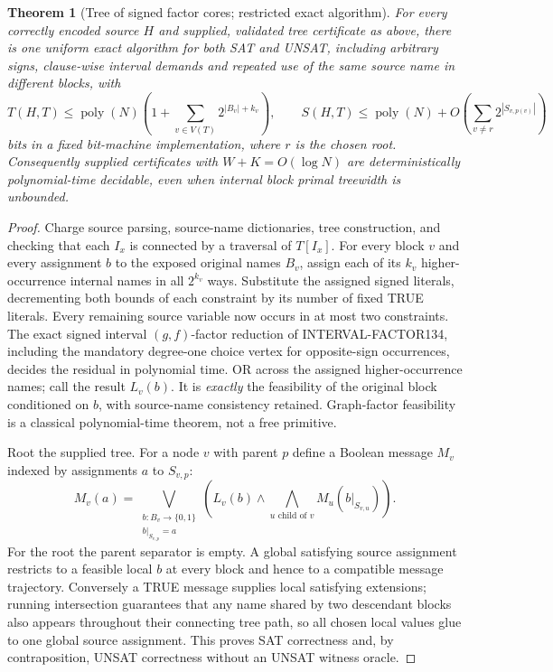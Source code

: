 \documentclass[11pt]{article}
\newtheorem{theorem}{Theorem}
\begin{document}
\begin{theorem}[Tree of signed factor cores; restricted exact algorithm]
For every correctly encoded source $H$ and \emph{supplied, validated}
tree certificate as above, there is one uniform exact algorithm for
both SAT and UNSAT, including arbitrary signs, clause-wise interval
demands and repeated use of the same source name in different blocks,
with
\[
T(H,T)\le \operatorname{poly}(N)
\left(1+\sum_{v\in V(T)}2^{|B_v|+k_v}\right),\qquad
S(H,T)\le \operatorname{poly}(N)+
O\!\left(\sum_{v\ne r}2^{|S_{v,p(v)}|}\right)
\]
bits in a fixed bit-machine implementation, where $r$ is the chosen root.
Consequently supplied certificates with $W+K=O(\log N)$ are
deterministically polynomial-time decidable, even when internal
block primal treewidth is unbounded.
\end{theorem}
\begin{proof}
Charge source parsing, source-name dictionaries, tree construction,
and checking that each $I_x$ is connected by a traversal of $T[I_x]$.
For every block $v$ and every assignment $b$ to the exposed original
names $B_v$, assign each of its $k_v$ higher-occurrence internal names
in all $2^{k_v}$ ways. Substitute the assigned signed literals, decrementing
both bounds of each constraint by its number of fixed TRUE literals.
Every remaining source variable now occurs in at most two constraints.
The exact signed interval $(g,f)$-factor reduction of
INTERVAL-FACTOR134, including the mandatory degree-one choice vertex
for opposite-sign occurrences, decides the residual in polynomial time.
OR across the assigned higher-occurrence names; call the result
$L_v(b)$. It is \emph{exactly} the feasibility of the original block
conditioned on $b$, with source-name consistency retained. Graph-factor
feasibility is a classical polynomial-time theorem, not a free primitive.

Root the supplied tree. For a node $v$ with parent $p$ define a Boolean
message $M_v$ indexed by assignments $a$ to $S_{v,p}$:
\[
M_v(a)=\bigvee_{\substack{b:B_v\to\{0,1\}\\
 b|_{S_{v,p}}=a}}
\left(L_v(b)\wedge\bigwedge_{u\text{ child of }v}
M_u(b|_{S_{v,u}})\right).
\]
For the root the parent separator is empty. A global satisfying source
assignment restricts to a feasible local $b$ at every block and hence
to a compatible message trajectory. Conversely a TRUE message
supplies local satisfying extensions; running intersection guarantees
that any name shared by two descendant blocks also appears throughout
their connecting tree path, so all chosen local values glue to one
global source assignment. This proves SAT correctness and, by
contraposition, UNSAT correctness without an UNSAT witness oracle.


\end{proof}
\end{document}
